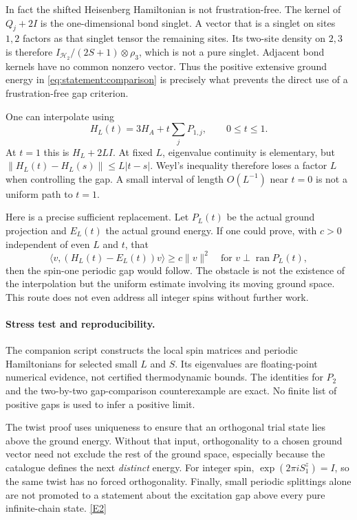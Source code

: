 \documentclass[11pt,a4paper]{article}
\newcommand{\eref}[2]{\hyperlink{extra:#1:#2}{[E#2]}}
\numberwithin{equation}{section}
\begin{document}
In fact the shifted Heisenberg Hamiltonian is not frustration-free.
The kernel of $Q_j+2I$ is the one-dimensional bond singlet. A vector that is
a singlet on sites $1,2$ factors as that singlet tensor the remaining sites.
Its two-site density on $2,3$ is therefore $I_{\mathcal H_2}/(2S+1)\otimes\rho_3$, which
is not a pure singlet. Adjacent bond kernels have no common nonzero vector.
Thus the positive extensive ground energy in
\eqref{eq:statement:comparison} is precisely what prevents the direct use of a
frustration-free gap criterion.

One can interpolate using
\[
 H_L(t)=3H_A+t\sum_jP_{1,j},\qquad0\leq t\leq1.
\]
At $t=1$ this is $H_L+2LI$. At fixed $L$, eigenvalue continuity is elementary,
but $\|H_L(t)-H_L(s)\|\leq L|t-s|$. Weyl's inequality therefore loses a
factor $L$ when controlling the gap. A small interval of length $O(L^{-1})$
near $t=0$ is not a uniform path to $t=1$.

Here is a precise sufficient replacement. Let $P_L(t)$ be the actual
ground projection and $E_L(t)$ the actual ground energy. If one could prove,
with $c>0$ independent of even $L$ and $t$, that
\begin{equation}\label{eq:statement:path}
 \langle v,(H_L(t)-E_L(t))v\rangle\geq c\|v\|^2
 \quad\text{for }v\perp\operatorname{ran}P_L(t),
\end{equation}
then the spin-one periodic gap would follow. The obstacle is not the
existence of the interpolation but the uniform estimate involving its
moving ground space. This route does not even address all integer spins
without further work.

\paragraph{Stress test and reproducibility.}
The companion script constructs the local spin matrices and periodic
Hamiltonians for selected small $L$ and $S$. Its eigenvalues are floating-point
numerical evidence, not certified thermodynamic bounds. The identities for
$P_2$ and the two-by-two gap-comparison counterexample are exact. No finite
list of positive gaps is used to infer a positive limit.

The twist proof uses uniqueness to ensure that an orthogonal trial state
lies above the ground energy. Without that input, orthogonality to a chosen
ground vector need not exclude the rest of the ground space, especially
because the catalogue defines the next \emph{distinct} energy. For integer
spin, $\exp(2\pi iS_1^z)=I$, so the same twist has no forced orthogonality.
Finally, small periodic splittings alone are not promoted to a statement
about the excitation gap above every pure infinite-chain state.
\eref{statement}{2}
\end{document}
